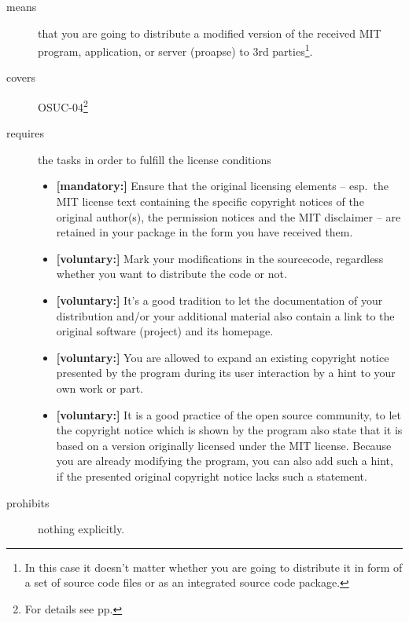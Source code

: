 \begin{description}
\item[means] that you are going to distribute a modified version of the received
MIT program, application, or server (proapse) to 3rd parties\footnote{In this
case it doesn't matter whether you are going to distribute it in form of a set
of source code files or as an integrated source code package.}.
\item[covers] OSUC-04\footnote{For details see pp. \pageref{OSUC-04-DEF}}
\item[requires] the tasks in order to fulfill the license conditions
\begin{itemize}
  \item \textbf{[mandatory:]} Ensure that the original licensing elements -- esp.\
  the MIT license text containing the specific copyright notices of the original
  author(s), the permission notices and the MIT disclaimer -- are retained in
  your package in the form you have received them.
  \item \textbf{[voluntary:]} Mark your modifications in the sourcecode,
  regardless whether you want to distribute the code or not.
  \item \textbf{[voluntary:]} It's a good tradition to let the documentation of
  your distribution and/or your additional material also contain a link to the
  original software (project) and its homepage.
  \item \textbf{[voluntary:]} You are allowed to expand an existing copyright
  notice presented by the program during its user interaction by a hint to your
  own work or part.
  \item \textbf{[voluntary:]} It is a good practice of the open source
  community, to let the copyright notice which is shown by the program also
  state that it is based on a version originally licensed under the MIT license.
  Because you are already modifying the program, you can also add such a hint,
  if the presented original copyright notice lacks such a statement.
\end{itemize}
\item[prohibits] nothing explicitly.
\end{description}

